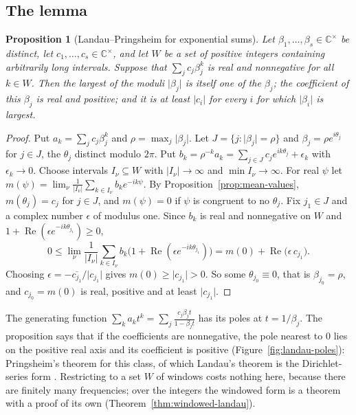 \documentclass[11pt]{amsbook}
\theoremstyle{plain}
\newtheorem{proposition}[theorem]{Proposition}
\theoremstyle{definition}
\theoremstyle{remark}
\numberwithin{equation}{section}
\numberwithin{figure}{chapter}
\numberwithin{table}{chapter}
\renewcommand{\C}{\mathbb{C}}
\DeclareMathOperator{\Real}{Re}
\begin{document}
\subsection{The lemma}

\begin{proposition}[Landau--Pringsheim for exponential sums]
\label{prop:landau}
Let $\beta_1,\dots,\beta_s\in\C^\times$ be distinct, let
$c_1,\dots,c_s\in\C^\times$, and let $W$ be a set of positive
integers containing arbitrarily long intervals. Suppose that
$\sum_jc_j\beta_j^k$ is real and nonnegative for all $k\in W$. Then
the largest of the moduli $\lvert\beta_j\rvert$ is itself one of
the $\beta_j$; the coefficient of this $\beta_j$ is real and
positive; and it is at least $\lvert c_i\rvert$ for every $i$ for
which $\lvert\beta_i\rvert$ is largest.
\end{proposition}

\begin{proof}
Put $a_k=\sum_jc_j\beta_j^k$ and
$\rho=\max_j\lvert\beta_j\rvert$. Let $J=\{j:\lvert\beta_j\rvert=\rho\}$ and
$\beta_j=\rho e^{i\theta_j}$ for $j\in J$, the $\theta_j$ distinct
modulo $2\pi$. Put
$b_k=\rho^{-k}a_k=\sum_{j\in J}c_je^{ik\theta_j}+\epsilon_k$ with
$\epsilon_k\to0$. Choose intervals $I_\nu\subseteq W$ with
$\lvert I_\nu\rvert\to\infty$ and $\min I_\nu\to\infty$. For real
$\psi$ let
$m(\psi)=\lim_\nu\frac1{\lvert I_\nu\rvert}
\sum_{k\in I_\nu}b_ke^{-ik\psi}$.
By Proposition~\ref{prop:mean-values}, $m(\theta_j)=c_j$ for
$j\in J$, and $m(\psi)=0$ if $\psi$ is congruent to no $\theta_j$.
Fix $j_1\in J$ and a complex number $\epsilon$ of modulus one.
Since $b_k$ is real and nonnegative on $W$ and
$1+\Real(\epsilon e^{-ik\theta_{j_1}})\ge0$,
\[
0\le\lim_\nu\frac1{\lvert I_\nu\rvert}\sum_{k\in I_\nu}
b_k\bigl(1+\Real(\epsilon e^{-ik\theta_{j_1}})\bigr)
=m(0)+\Real\bigl(\epsilon\,c_{j_1}\bigr).
\]
Choosing $\epsilon=-\overline{c_{j_1}}/\lvert c_{j_1}\rvert$ gives
$m(0)\ge\lvert c_{j_1}\rvert>0$. So some $\theta_{j_0}\equiv0$,
that is $\beta_{j_0}=\rho$, and $c_{j_0}=m(0)$ is real, positive
and at least $\lvert c_{j_1}\rvert$.
\end{proof}

The generating function
$\sum_ka_kt^k=\sum_j\frac{c_j\beta_jt}{1-\beta_jt}$ has its poles
at $t=1/\beta_j$. The proposition says that if the coefficients are
nonnegative, the pole nearest to $0$ lies on the positive real axis
and its coefficient is positive
(Figure~\ref{fig:landau-poles}): Pringsheim's theorem for this
class, of which Landau's theorem is the Dirichlet-series form
\cite{Titchmarsh1939}. Restricting to a set $W$ of windows costs
nothing here, because there are finitely many frequencies; over the
integers the windowed form is a theorem with a proof of its own
(Theorem~\ref{thm:windowed-landau}).
\end{document}
